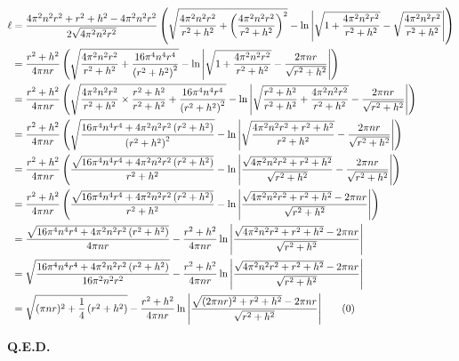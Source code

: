 \documentclass{article}
\begin{document}
\begin{align*}
    \ell &= \frac{4\pi^2n^2r^2+r^2+h^2-4\pi^2n^2r^2}{2\sqrt{4\pi^2n^2r^2}}\left(\sqrt{\frac{4\pi^2n^2r^2}{r^2+h^2}+\left(\frac{4\pi^2n^2r^2}{r^2+h^2}\right)^2}-\ln\Bigg|\sqrt{1+\frac{4\pi^2n^2r^2}{r^2+h^2}}-\sqrt{\frac{4\pi^2n^2r^2}{r^2+h^2}}\Bigg|\right)\\
    &= \frac{r^2+h^2}{4\pi nr}\left(\sqrt{\frac{4\pi^2n^2r^2}{r^2+h^2}+\frac{16\pi^4n^4r^4}{\left(r^2+h^2\right)^2}}-\ln\Bigg|\sqrt{1+\frac{4\pi^2n^2r^2}{r^2+h^2}}-\frac{2\pi nr}{\sqrt{r^2+h^2}}\Bigg|\right)\\
    &= \frac{r^2+h^2}{4\pi nr}\left(\sqrt{\frac{4\pi^2n^2r^2}{r^2+h^2}\times\frac{r^2+h^2}{r^2+h^2}+\frac{16\pi^4n^4r^4}{\left(r^2+h^2\right)^2}}-\ln\Bigg|\sqrt{\frac{r^2+h^2}{r^2+h^2}+\frac{4\pi^2n^2r^2}{r^2+h^2}}-\frac{2\pi nr}{\sqrt{r^2+h^2}}\Bigg|\right)\\
    &= \frac{r^2+h^2}{4\pi nr}\left(\sqrt{\frac{16\pi^4n^4r^4+4\pi^2n^2r^2\left(r^2+h^2\right)}{\left(r^2+h^2\right)^2}}-\ln\Bigg|\sqrt{\frac{4\pi^2n^2r^2+r^2+h^2}{r^2+h^2}}-\frac{2\pi nr}{\sqrt{r^2+h^2}}\Bigg|\right)\\
    &= \frac{r^2+h^2}{4\pi nr}\left(\frac{\sqrt{16\pi^4n^4r^4+4\pi^2n^2r^2\left(r^2+h^2\right)}}{r^2+h^2}-\ln\Bigg|\frac{\sqrt{4\pi^2n^2r^2+r^2+h^2}}{\sqrt{r^2+h^2}}-\frac{2\pi nr}{\sqrt{r^2+h^2}}\Bigg|\right)\\
    &= \frac{r^2+h^2}{4\pi nr}\left(\frac{\sqrt{16\pi^4n^4r^4+4\pi^2n^2r^2\left(r^2+h^2\right)}}{r^2+h^2}-\ln\Bigg|\frac{\sqrt{4\pi^2n^2r^2+r^2+h^2}-2\pi nr}{\sqrt{r^2+h^2}}\Bigg|\right)\\
    &= \frac{\sqrt{16\pi^4n^4r^4+4\pi^2n^2r^2\left(r^2+h^2\right)}}{4\pi nr}-\frac{r^2+h^2}{4\pi nr}\ln\Bigg|\frac{\sqrt{4\pi^2n^2r^2+r^2+h^2}-2\pi nr}{\sqrt{r^2+h^2}}\Bigg|\\
    &= \sqrt{\frac{16\pi^4n^4r^4+4\pi^2n^2r^2\left(r^2+h^2\right)}{16\pi^2 n^2r^2}}-\frac{r^2+h^2}{4\pi nr}\ln\Bigg|\frac{\sqrt{4\pi^2n^2r^2+r^2+h^2}-2\pi nr}{\sqrt{r^2+h^2}}\Bigg|\\
    &= \sqrt{(\pi nr)^2+\frac{1}{4}\left(r^2+h^2\right)}-\frac{r^2+h^2}{4\pi nr}\ln\Bigg|\frac{\sqrt{(2\pi nr)^2+r^2+h^2}-2\pi nr}{\sqrt{r^2+h^2}}\Bigg|\tag{\theequation}\label{eqn:fin1}
    \stepcounter{equation}
\end{align*}
\begin{flushright}
    \textbf{Q.E.D.}
\end{flushright}
\end{document}
